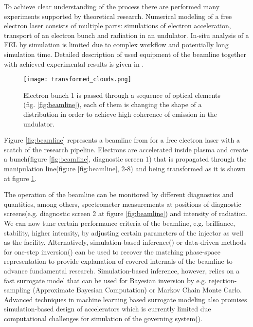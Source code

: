 \documentclass{article}
\begin{document}
To achieve clear understanding of the process there are performed many experiments supported by theoretical research.
Numerical modeling of a free electron laser consists of multiple parts: simulations of electron acceleration, transport of an electron bunch and radiation in an undulator.
In-situ analysis of a FEL by simulation is limited due to complex workflow and potentially long simulation time.
Detailed description of used equipment of the beamline together with achieved experimental results is given in \citet{hzdr_fel}.

\begin{figure}[h!]
  \centering
  \texttt{[image: transformed\_clouds.png]}
  \caption{Electron bunch 1 is passed through a sequence of optical elements (fig. \ref{fig:beamline}), each of them is changing the shape of a distribution in order to achieve high coherence of emission in the undulator.}
  \label{fig:tranclouds}
\end{figure}

Figure \ref{fig:beamline} represents a beamline from \citet{coxinel} for a free electron laser with a scatch of the research pipeline.
Electrons are accelerated inside plasma and create a bunch(figure \ref{fig:beamline}, diagnostic screen 1) that is propagated through the manipulation line(figure \ref{fig:beamline}, 2-8) and being transformed as it is shown at figure \ref{fig:tranclouds}.

The operation of the beamline can be monitored by different diagnostics and quantities, among others, spectrometer measurements at positions of diagnostic screens(e.g. diagnostic screen 2 at figure \ref{fig:beamline}) and intensity of radiation. 
We can now tune certain performance criteria of the beamline, e.g. brilliance, stability, higher intensity, by adjusting certain parameters of the injector as well as the facility. 
Alternatively, simulation-based inference(\citet{sbinference}) or data-driven methods for one-step inversion(\citet{Hoffmann2016}) can be used to recover the matching phase-space representation to provide explanation of covered internals of the beamline to advance fundamental research. 
Simulation-based inference, however, relies on a fast surrogate model that can be used for Bayesian inversion by e.g. rejection-sampling (Approximate Bayesian Computation) or Markov Chain Monte Carlo. Advanced techniques in machine learning based surrogate modeling also promises simulation-based design of accelerators which is currently limited due computational challenges for simulation of the governing system(\cite{lehe2020machine}).
\end{document}
